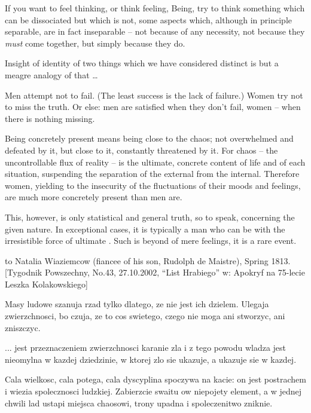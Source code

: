 \pa
If you want to feel thinking, or think feeling, Being, try to think 
something which can be dissociated but which is not, some aspects 
which, although in principle separable, are in fact inseparable -- 
not because of any necessity, not because they {\em must} come 
together, but simply because they do.

Insight of identity of two things which we have considered distinct is 
but a meagre analogy of that \ldots


\pa
Men attempt not to fail. (The least success is the lack of failure.) Women
try not to miss the truth. Or else: men are satisfied when they don't fail,
women -- when there is nothing missing.

\pa
Being concretely present means being close to the chaos; not overwhelmed and
defeated by it, but close to it, constantly threatened by it. For chaos --
the uncontrollable flux of reality -- is the ultimate, concrete content of
life and of each situation, suspending the separation of the external from
the internal. Therefore women, yielding to the insecurity of the fluctuations
of their moods and feelings, are much more concretely present than men are.

This, however, is only statistical and general truth, so to speak,
concerning the given nature.  In exceptional cases, it is typically a
man who can be  with the irresistible force of ultimate
.  Such  is  beyond
 of mere feelings, it is a rare  event.


to Natalia Wiaziemcow (fiancee of his son, Rudolph de Maistre), Spring 1813.
[Tygodnik Powszechny, No.43, 27.10.2002,  ``List Hrabiego'' w: Apokryf na
75-lecie Leszka Kolakowskiego] 

\pa
Masy ludowe szanuja rzad tylko dlatego, ze nie jest ich dzielem. Ulegaja
zwierzchnosci, bo czuja, ze to cos swietego, czego nie moga ani stworzyc, ani
zniszczyc.

\pa
... jest przeznaczeniem zwierzchnosci karanie zla i z tego powodu wladza jest
nieomylna w kazdej dziedzinie, w ktorej zlo sie ukazuje, a ukazuje sie w
kazdej.

\pa
Cala wielkosc, cala potega, cala dyscyplina spoczywa na kacie: on jest
postrachem i wiezia spolecznosci ludzkiej. Zabierzcie swaitu ow niepojety
element, a w jednej chwili lad ustapi miejsca chaosowi, trony upadna i
spoleczenitwo zniknie.

